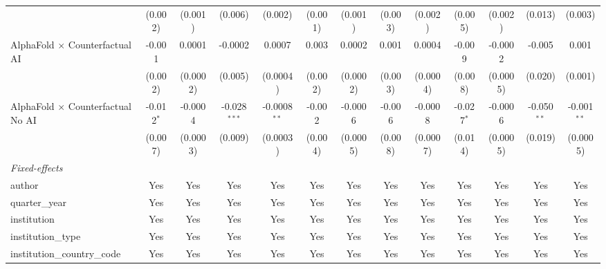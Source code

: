 \begin{tabular}{lcccccccccccc}
                                            & (0.002)       & (0.001)      & (0.006)        & (0.002)        & (0.001)  & (0.001)        & (0.003) & (0.002)       & (0.005)      & (0.002)  & (0.013)       & (0.003)\\   
   AlphaFold $\times$ Counterfactual AI     & -0.001        & 0.0001       & -0.0002        & 0.0007         & 0.003    & 0.0002         & 0.001   & 0.0004        & -0.009       & -0.0002  & -0.005        & 0.001\\   
                                            & (0.002)       & (0.0002)     & (0.005)        & (0.0004)       & (0.002)  & (0.0002)       & (0.003) & (0.0004)      & (0.008)      & (0.0005) & (0.020)       & (0.001)\\   
   AlphaFold $\times$ Counterfactual No AI  & -0.012$^{*}$  & -0.0004      & -0.028$^{***}$ & -0.0008$^{**}$ & -0.002   & -0.0006        & -0.006  & -0.0008       & -0.027$^{*}$ & -0.0006  & -0.050$^{**}$ & -0.001$^{**}$\\   
                                            & (0.007)       & (0.0003)     & (0.009)        & (0.0003)       & (0.004)  & (0.0005)       & (0.008) & (0.0007)      & (0.014)      & (0.0005) & (0.019)       & (0.0005)\\   
   \midrule
   \emph{Fixed-effects}\\
   author                                   & Yes           & Yes          & Yes            & Yes            & Yes      & Yes            & Yes     & Yes           & Yes          & Yes      & Yes           & Yes\\  
   quarter\_year                            & Yes           & Yes          & Yes            & Yes            & Yes      & Yes            & Yes     & Yes           & Yes          & Yes      & Yes           & Yes\\  
   institution                              & Yes           & Yes          & Yes            & Yes            & Yes      & Yes            & Yes     & Yes           & Yes          & Yes      & Yes           & Yes\\  
   institution\_type                        & Yes           & Yes          & Yes            & Yes            & Yes      & Yes            & Yes     & Yes           & Yes          & Yes      & Yes           & Yes\\  
   institution\_country\_code               & Yes           & Yes          & Yes            & Yes            & Yes      & Yes            & Yes     & Yes           & Yes          & Yes      & Yes           & Yes\\  

\end{tabular}
